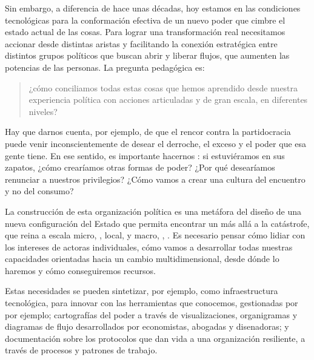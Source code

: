 Sin embargo, a diferencia de hace unas décadas, hoy estamos en las condiciones tecnológicas para la conformación efectiva de un nuevo poder que cimbre el estado actual de las cosas. Para lograr una transformación real necesitamos accionar desde distintas aristas y facilitando la conexión estratégica entre distintos grupos políticos que buscan abrir y liberar flujos, que aumenten las potencias de las personas. La pregunta pedagógica es:

\begin{quote}
	¿cómo conciliamos todas estas cosas que hemos aprendido desde nuestra experiencia política con acciones articuladas y de gran escala, en diferentes niveles?
\end{quote}

Hay que darnos cuenta, por ejemplo, de que el rencor contra la partidocracia puede venir inconscientemente de desear el derroche, el exceso y el poder que esa gente tiene. En ese sentido, es importante hacernos : si estuviéramos en sus zapatos, ¿cómo crearíamos otras formas de poder? ¿Por qué desearíamos renunciar a nuestros privilegios? ¿Cómo vamos a crear una cultura del encuentro y no del consumo?

La construcción de esta organización política es una metáfora del diseño de una nueva configuración del Estado que permita encontrar un más allá a la catástrofe, que reina a escala micro, , local, y macro, , . Es necesario pensar cómo lidiar con los intereses de actoras individuales, cómo vamos a desarrollar todas nuestras capacidades orientadas hacia un cambio multidimensional, desde dónde lo haremos y cómo conseguiremos recursos.

Estas necesidades se pueden sintetizar, por ejemplo, como infraestructura tecnológica, para innovar con las herramientas que conocemos, gestionadas por  por ejemplo; cartografías del poder a través de visualizaciones, organigramas y diagramas de flujo desarrollados por economistas, abogadas y disenadoras; y documentación sobre los protocolos que dan vida a una organización resiliente, a través de procesos y patrones de trabajo.


